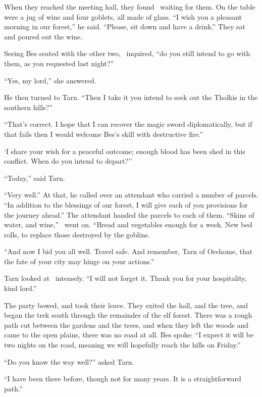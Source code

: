 When they reached the meeting hall, they found \arilor\ waiting for them.  On the table were a jug of wine and four goblets, all made of glass.  ``I wish you a pleasant morning in our forest,'' he said.  ``Please, sit down and have a drink.''  They sat and poured out the wine.

Seeing Bes seated with the other two, \arilor\ inquired, ``do you still intend to go with them, as you requested last night?''

``Yes, my lord,'' she answered.

He then turned to Tarn.  ``Then I take it you intend to seek out the Tholkis in the southern hills?''

``That's correct.  I hope that I can recover the magic sword diplomatically, but if that fails then I would welcome Bes's skill with destructive fire.''

`I share your wish for a peaceful outcome; enough blood has been shed in this conflict.  When do you intend to depart?''

``Today,'' said Tarn.

``Very well.''  At that, he called over an attendant who carried a number of parcels.  ``In addition to the blessings of our forest, I will give each of you provisions for the journey ahead.''  The attendant handed the parcels to each of them.  ``Skins of water, and wine,'' \arilor\ went on.  ``Bread and vegetables enough for a week.  New bed rolls, to replace those destroyed by the goblins.

``And now I bid you all well.  Travel safe.  And remember, Tarn of Orehome, that the fate of your city may hinge on your actions.''

Tarn looked at \arilor\ intensely.  ``I will not forget it.  Thank you for your hospitality, kind lord.''

The party bowed, and took their leave.  They exited the hall, and the tree, and began the trek south through the remainder of the elf forest.  There was a rough path cut between the gardens and the trees, and when they left the woods and came to the open plains, there was no road at all.  Bes spoke: ``I expect it will be two nights on the road, meaning we will hopefully reach the hills on Friday.''

``Do you know the way well?'' asked Tarn.

``I have been there before, though not for many years.  It is a straightforward path.''

